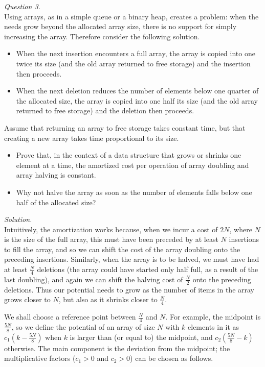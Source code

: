 \documentclass[11pt]{article}
\begin{document}
\bigskip
\noindent
\emph{Question 3.}\\
Using arrays, as in a simple queue or a binary heap, creates a problem:
when the needs grow beyond the allocated array size, there is no support
for simply increasing the array.  Therefore consider the following solution.
\begin{itemize}
  \itemsep 0pt
  \item
    When the next insertion encounters a full array, the array is copied into
    one twice its size (and the old array returned to free storage) and the
    insertion then proceeds.
  \item
    When the next deletion reduces the number of elements below one quarter of
    the allocated size, the array is copied into one half its size (and the old
    array returned to free storage) and the deletion then proceeds.
\end{itemize}
Assume that returning an array to free storage takes constant time, but
that creating a new array takes time proportional to its size.
\begin{itemize}
  \itemsep 0pt
  \item
    Prove that, in the context of a data structure that grows or shrinks one
    element at a time, the amortized cost per operation of array doubling and
    array halving is constant.
  \item
    Why not halve the array as soon as the number of elements falls below one
    half of the allocated size?
\end{itemize}

\noindent\emph{Solution.}\\
Intuitively, the amortization works because, when we incur a cost of $2N$,
where $N$ is the size of the full array, this must have been preceded by at
least $N$ insertions to fill the array, and so we can shift the cost of the
array doubling onto the preceding insertions.  Similarly, when  the array is to
be halved, we must have had at least $\frac{N}{4}$ deletions (the array could
have started only half full, as a result of the last doubling), and again we
can shift the halving cost of $\frac{N}{2}$ onto the preceding deletions.  Thus
our potential needs to grow as the number of items in the array grows closer
to $N$, but also as it shrinks closer to $\frac{N}{4}$.

We shall choose a reference point between $\frac{N}{4}$ and $N$.
For example, the midpoint is $\frac{5N}{8}$, so we define the potential of an array of size
$N$ with $k$ elements in it as $c_1(k-\frac{5N}{8})$ when $k$ is larger
than (or equal to) the midpoint, and  $c_2 (\frac{5N}{8}-k)$
otherwise.
The main component is the deviation from the midpoint;
the multiplicative factors ($c_1 > 0$ and $c_2 > 0$) can be chosen as follows.
\end{document}
